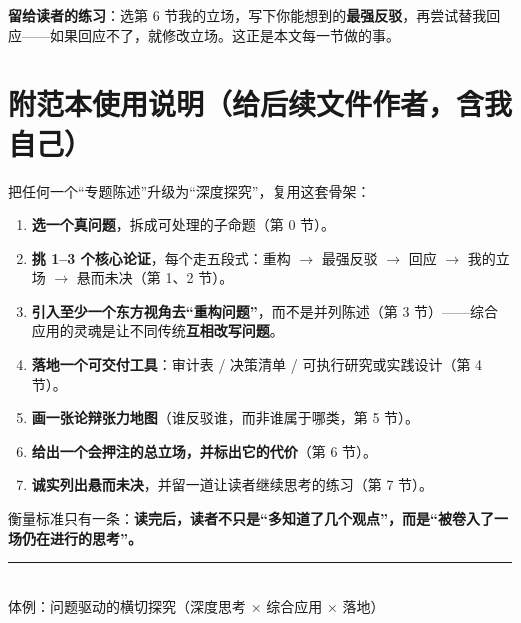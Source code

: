 \documentclass[12pt,a4paper,fontset=none]{ctexart}
\begin{document}
\begin{note}
\textbf{留给读者的练习}：选第 6 节我的立场，写下你能想到的\textbf{最强反驳}，再尝试替我回应——如果回应不了，就修改立场。这正是本文每一节做的事。
\end{note}

\section*{附\quad 范本使用说明（给后续文件作者，含我自己）}

把任何一个“专题陈述”升级为“深度探究”，复用这套骨架：

\begin{enumerate}[leftmargin=2.2em,itemsep=0.25em]
\item \textbf{选一个真问题}，拆成可处理的子命题（第 0 节）。
\item \textbf{挑 1--3 个核心论证}，每个走五段式：重构 \(\rightarrow\) 最强反驳 \(\rightarrow\) 回应 \(\rightarrow\) 我的立场 \(\rightarrow\) 悬而未决（第 1、2 节）。
\item \textbf{引入至少一个东方视角去“重构问题”}，而不是并列陈述（第 3 节）——综合应用的灵魂是让不同传统\textbf{互相改写问题}。
\item \textbf{落地一个可交付工具}：审计表 / 决策清单 / 可执行研究或实践设计（第 4 节）。
\item \textbf{画一张论辩张力地图}（谁反驳谁，而非谁属于哪类，第 5 节）。
\item \textbf{给出一个会押注的总立场，并标出它的代价}（第 6 节）。
\item \textbf{诚实列出悬而未决}，并留一道让读者继续思考的练习（第 7 节）。
\end{enumerate}

\begin{mainline}
衡量标准只有一条：\textbf{读完后，读者不只是“多知道了几个观点”，而是“被卷入了一场仍在进行的思考”。}
\end{mainline}

\vfill
\begin{center}
{\color{rule}\rule{0.35\textwidth}{0.6pt}}\\[0.4em]
{\small\sffamily\color{notebar} 体例：问题驱动的横切探究（深度思考 × 综合应用 × 落地）}
\end{center}
\end{document}
